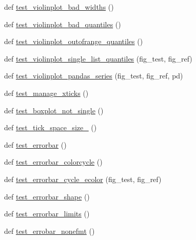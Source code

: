 \begin{DoxyCompactItemize}
\item 
def \hyperlink{namespacematplotlib_1_1tests_1_1test__axes_ab52f3ef08e90b503a4fd843a232f7cc5}{test\+\_\+violinplot\+\_\+bad\+\_\+widths} ()
\item 
def \hyperlink{namespacematplotlib_1_1tests_1_1test__axes_a9a094c3ac3569a2ec47c461feedf0fbd}{test\+\_\+violinplot\+\_\+bad\+\_\+quantiles} ()
\item 
def \hyperlink{namespacematplotlib_1_1tests_1_1test__axes_a6f763ff2df2cd3e86bd4a54318a01b49}{test\+\_\+violinplot\+\_\+outofrange\+\_\+quantiles} ()
\item 
def \hyperlink{namespacematplotlib_1_1tests_1_1test__axes_a9fab87743f79686d10c9fd6a7d5fadf6}{test\+\_\+violinplot\+\_\+single\+\_\+list\+\_\+quantiles} (fig\+\_\+test, fig\+\_\+ref)
\item 
def \hyperlink{namespacematplotlib_1_1tests_1_1test__axes_a4101233579cc433bedb7f86b27ed3300}{test\+\_\+violinplot\+\_\+pandas\+\_\+series} (fig\+\_\+test, fig\+\_\+ref, pd)
\item 
def \hyperlink{namespacematplotlib_1_1tests_1_1test__axes_abd15cf35151b88a0d73539cf8777ee6d}{test\+\_\+manage\+\_\+xticks} ()
\item 
def \hyperlink{namespacematplotlib_1_1tests_1_1test__axes_afbd3f9bd3bbb438828664e40322748da}{test\+\_\+boxplot\+\_\+not\+\_\+single} ()
\item 
def \hyperlink{namespacematplotlib_1_1tests_1_1test__axes_a51cd7385096c506d42d2dbc456cf82eb}{test\+\_\+tick\+\_\+space\+\_\+size\+\_} ()
\item 
def \hyperlink{namespacematplotlib_1_1tests_1_1test__axes_ae75bc8173346d4e98c75efc4802de6a2}{test\+\_\+errorbar} ()
\item 
def \hyperlink{namespacematplotlib_1_1tests_1_1test__axes_a25275b65f3046ba88763b0813a8eabf4}{test\+\_\+errorbar\+\_\+colorcycle} ()
\item 
def \hyperlink{namespacematplotlib_1_1tests_1_1test__axes_a3f5f85019dd31928d8e5ae957e1ef14b}{test\+\_\+errorbar\+\_\+cycle\+\_\+ecolor} (fig\+\_\+test, fig\+\_\+ref)
\item 
def \hyperlink{namespacematplotlib_1_1tests_1_1test__axes_a891bfb76b4b028d3a34ee1a5931be924}{test\+\_\+errorbar\+\_\+shape} ()
\item 
def \hyperlink{namespacematplotlib_1_1tests_1_1test__axes_a102113159ab8b372550172f7a0adf2a0}{test\+\_\+errorbar\+\_\+limits} ()
\item 
def \hyperlink{namespacematplotlib_1_1tests_1_1test__axes_a2062828ba2f0b071a1075c43333a6601}{test\+\_\+errobar\+\_\+nonefmt} ()

\end{DoxyCompactItemize}
